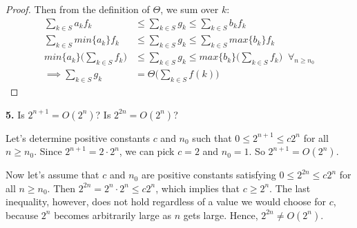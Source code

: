 \documentclass[addpoints]{exam}
\begin{document}
\begin{questions}
\begin{solution}
\begin{proof}
      Then from the definition of $\Theta$, we sum over $k$:
      \begin{align*}
        \sum_{k \in S} a_k f_k                     & \leq \sum_{k \in S} g_k \leq \sum_{k \in S} b_k f_k                                                \\
        \sum_{k \in S} min\{a_k\} f_k              & \leq \sum_{k \in S} g_k \leq \sum_{k \in S} max\{b_k\}f_k                                          \\
        min\{a_k\}\biggl(\sum_{k \in S} f_k\biggr) & \leq \sum_{k \in S} g_k \leq max\{b_k\} \biggl(\sum_{k \in S} f_k\biggr) \;\; \forall_{n \geq n_0} \\
        \implies \sum_{k \in S} g_k                & = \Theta \biggl( \sum_{k \in S} f(k) \biggr)
      \end{align*}
    \end{proof}
  \end{solution}

  \question
  \textbf{5. } Is $ 2^{n + 1} = O(2^n)$? Is $ 2^{2n} = O(2^n) $?
  \begin{solution}
    Let's determine positive constants $c$ and $n_0$ such that $0\le2^{n+1}\le c2^n$ for all $n\ge n_0$.
    Since $2^{n+1}=2\cdot2^n$, we can pick $c=2$ and $n_0=1$.
    So $2^{n+1}=O(2^n)$.

    Now let's assume that $c$ and $n_0$ are positive constants satisfying $0\le2^{2n}\le c2^n$ for all $n\ge n_0$.
    Then $2^{2n}=2^n\cdot2^n\le c2^n$, which implies that $c\ge2^n$.
    The last inequality, however, does not hold regardless of a value we would choose for $c$, because $2^n$ becomes arbitrarily large as $n$ gets large.
    Hence, $2^{2n}\ne O(2^n)$.
  \end{solution}

\end{questions}
\end{document}
